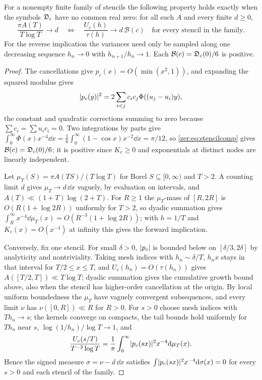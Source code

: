 \begin{theorem}\label{zer:thm:stencilbank}
For a nonempty finite family of stencils the following property holds exactly when the symbols
$\mathfrak{D}_c$ have no common real zero: for all such $A$ and every finite $d\ge0$,
\[
 \frac{\pi A(T)}{T\log T}\longrightarrow d
 \quad\Longleftrightarrow\quad
 \frac{U_c(h)}{\tau(h)}\longrightarrow d\,\mathcal B(c)\quad\text{for every stencil in the family.}
\]
For the reverse implication the variances need only be sampled along one decreasing sequence
$h_n\to0$ with $h_{n+1}/h_n\to1$. Each $\mathcal B(c)=\mathfrak{D}_c(0)/6$ is positive.
\end{theorem}
\begin{proof}
The cancellations give $p_c(x)=O(\min(x^2,1))$, and expanding the squared modulus gives
\begin{equation}\label{zer:eq:stencilcomp}
 \lvert p_c(y)\rvert^2=2\sum_{i<j}c_ic_j\Phi((u_j-u_i)y),
\end{equation}
the constant and quadratic corrections summing to zero because $\sum c_i=\sum u_ic_i=0$. Two
integrations by parts give $\int_0^\infty\Phi(x)x^{-4}\dd x=\frac16\int_0^\infty(1-\cos x)x^{-2}\dd x=\pi/12$,
so \eqref{zer:eq:stencilcomp} gives $\mathcal B(c)=\mathfrak{D}_c(0)/6$; it is positive since $K_c\ge0$ and
exponentials at distinct nodes are linearly independent.

Let $\mu_T(S)=\pi A(TS)/(T\log T)$ for Borel $S\subseteq[0,\infty)$ and $T>2$. A counting limit $d$ gives $\mu_T\to d\,\dd x$ vaguely, by
evaluation on intervals, and $A(T)\ll(1+T)\log(2+T)$. For $R\ge1$ the $\mu_T$-mass of $[R,2R]$ is
$O(R(1+\log 2R))$ uniformly for $T>2$, so dyadic summation gives
$\int_R^\infty x^{-4}\dd\mu_T(x)=O(R^{-3}(1+\log 2R))$; with $h=1/T$ and $K_c(x)=O(x^{-4})$ at infinity this
gives the forward implication.

Conversely, fix one stencil. For small $\delta>0$, $\lvert p_c\rvert$ is bounded below on $[\delta/3,2\delta]$ by
analyticity and nontriviality. Taking mesh indices with $h_n\sim\delta/T$, $h_nx$ stays in that interval for
$T/2\le x\le T$, and $U_c(h_n)=O(\tau(h_n))$ gives $A([T/2,T])\ll T\log T$; dyadic summation gives the
cumulative growth bound above, also when the stencil has higher-order cancellation at the origin. By
local uniform boundedness the $\mu_T$ have vaguely convergent subsequences, and every limit $\nu$ has
$\nu([0,R])\ll R$ for $R>0$. For $s>0$ choose mesh indices with $Th_n\to s$; the kernels converge on
compacts, the tail bounds hold uniformly for $Th_n$ near $s$, $\log(1/h_n)/\log T\to1$, and
\[
 \frac{U_c(s/T)}{T^{-3}\log T}=\frac1\pi\int_0^\infty\lvert p_c(sx)\rvert^2x^{-4}\mathrm{d}\mu_T(x).
\]
Hence the signed measure $\sigma=\nu-d\,\dd x$ satisfies $\int\lvert p_c(sx)\rvert^2x^{-4}\mathrm{d}\sigma(x)=0$ for every
$s>0$ and each stencil of the family.


\end{proof}
